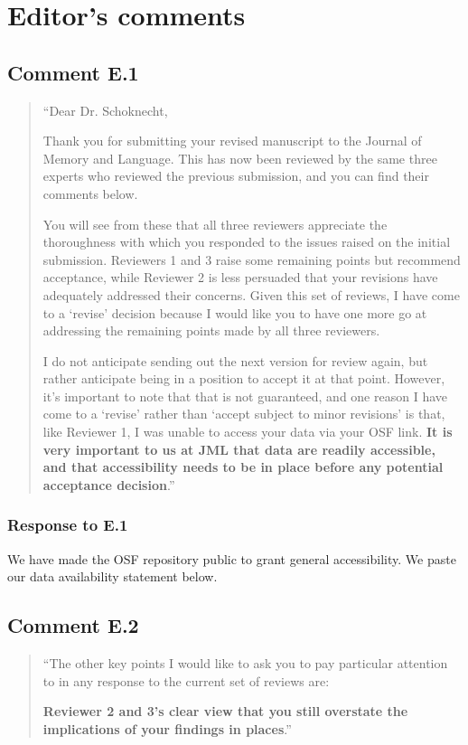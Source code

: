 \documentclass[12pt]{article}
\begin{document}
\section*{Editor's comments} 
\subsection*{Comment E.1}
\begin{quote}
``Dear Dr. Schoknecht,

Thank you for submitting your revised manuscript to the Journal of Memory and Language. This has now been reviewed by the same three experts who reviewed the previous submission, and you can find their comments below.

You will see from these that all three reviewers appreciate the thoroughness with which you responded to the issues raised on the initial submission. Reviewers 1 and 3 raise some remaining points but recommend acceptance, while Reviewer 2 is less persuaded that your revisions have adequately addressed their concerns. Given this set of reviews, I have come to a `revise' decision because I would like you to have one more go at addressing the remaining points made by all three reviewers.

I do not anticipate sending out the next version for review again, but rather anticipate being in a position to accept it at that point. However, it's important to note that that is not guaranteed, and one reason I have come to a `revise' rather than `accept subject to minor revisions' is that, like Reviewer 1, I was unable to access your data via your OSF link. \textbf{It is very important to us at JML that data are readily accessible, and that accessibility needs to be in place before any potential acceptance decision}.''
\end{quote}

\subsubsection*{Response to E.1}
We have made the OSF repository public to grant general accessibility. We paste our data availability statement below.

\begin{quote}
\end{quote}



\subsection*{Comment E.2}
\begin{quote}
``The other key points I would like to ask you to pay particular attention to in any response to the current set of reviews are:

\textbf{Reviewer 2 and 3's clear view that you still overstate the implications of your findings in places}.''
\end{quote}
\end{document}
